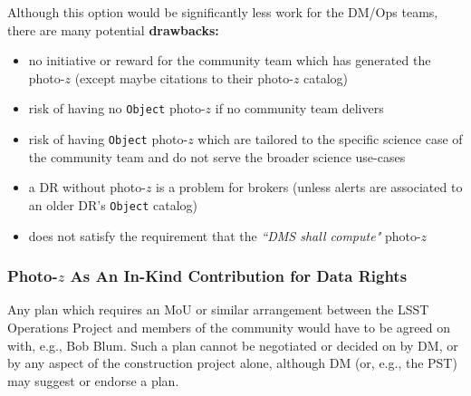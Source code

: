\documentclass[DM,lsstdraft,toc]{lsstdoc}
\begin{document}
Although this option would be significantly less work for the DM/Ops teams, there are many potential {\bf drawbacks:}

\begin{itemize}[noitemsep,topsep=-10pt]
\item no initiative or reward for the community team which has generated the photo-$z$ (except maybe citations to their photo-$z$ catalog)
\item risk of having no {\tt Object} photo-$z$ if no community team delivers
\item risk of having {\tt Object} photo-$z$ which are tailored to the specific science case of the community team and do not serve the broader science use-cases
\item a DR without photo-$z$ is a problem for brokers (unless alerts are associated to an older DR's {\tt Object} catalog)
\item does not satisfy the requirement that the {\it ``DMS shall compute"} photo-$z$
\end{itemize}

\subsubsection{Photo-$z$ As An In-Kind Contribution for Data Rights}

Any plan which requires an MoU or similar arrangement between the LSST Operations Project and members of the community would have to be agreed on with, e.g., Bob Blum.
Such a plan cannot be negotiated or decided on by DM, or by any aspect of the construction project alone, although DM (or, e.g., the PST) may suggest or endorse a plan.


\end{document}
